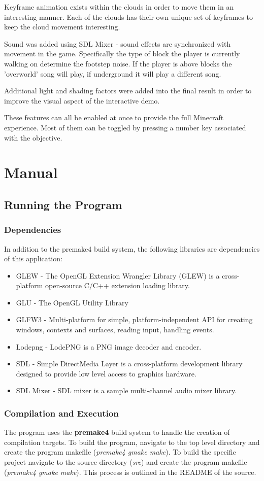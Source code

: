 \documentclass{book}
\begin{document}
Keyframe animation exists within the clouds in order to move them in an interesting manner.  Each of the clouds has their own unique set of keyframes to keep the cloud movement interesting.

Sound was added using SDL Mixer - sound effects are synchronized with movement in the game.  Specifically the type of block the player is currently walking on determine the footstep noise.  If the player is above blocks the 'overworld' song will play, if underground it will play a different song. 

Additional light and shading factors were added into the final result in order to improve the visual aspect of the interactive demo.

These features can all be enabled at once to provide the full Minecraft experience. Most of them can be toggled by pressing a number key associated with the objective. 

\chapter{Manual}
\section{Running the Program}
\subsection{Dependencies}
In addition to the premake4 build system, the following libraries are dependencies of this application:
\begin{itemize}
	\item GLEW - The OpenGL Extension Wrangler Library (GLEW) is a cross-platform open-source C/C++ extension loading library.
	\item GLU - The OpenGL Utility Library
	\item GLFW3 - Multi-platform for simple, platform-independent API for creating windows, contexts and surfaces, reading input, handling events.
	\item Lodepng - LodePNG is a PNG image decoder and encoder.
	\item SDL - Simple DirectMedia Layer is a cross-platform development library designed to provide low level access to graphics hardware.
	\item SDL Mixer - SDL mixer is a sample multi-channel audio mixer library. 
\end{itemize}

\subsection{Compilation and Execution}
The program uses the \textbf{premake4} build system to handle the creation of compilation targets.  To build the program, navigate to the top level directory and create the program makefile (\textit{premake4 gmake  make}).  To build the specific project navigate to the source directory (\textit{src}) and create the program makefile (\textit{premake4 gmake make}).
This process is outlined in the README of the source.
\end{document}
